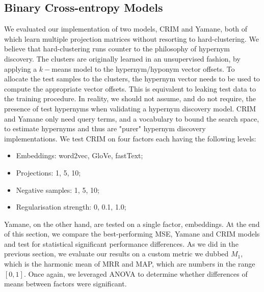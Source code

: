 \subsection{Binary Cross-entropy Models}
We evaluated our implementation of two models, CRIM and Yamane, both of which learn multiple projection matrices without resorting to hard-clustering.  We believe that hard-clustering runs counter to the philosophy of hypernym discovery.  The clusters are originally learned in an unsupervised fashion, by applying a $k-$means model to the hypernym/hyponym vector offsets.  To allocate the test samples to the clusters, the hypernym vector needs to be used to compute the appropriate vector offsets.  This is equivalent to leaking test data to the training procedure.  In reality, we should not assume, and do not require, the presence of test hypernyms when validating a hypernym discovery model.  CRIM and Yamane only need query terms, and a vocabulary to bound the search space, to estimate hypernyms and thus are "purer" hypernym discovery implementations.  We test CRIM on four factors each having the following levels:
\begin{itemize}
    \item Embeddings: word2vec, GloVe, fastText;
    \item Projections: 1, 5, 10;
    \item Negative samples: 1, 5, 10;
    \item Regularisation strength: 0, 0.1, 1.0;
\end{itemize}
Yamane, on the other hand, are tested on a single factor, embeddings.  At the end of this section, we compare the best-performing MSE, Yamane and CRIM models and test for statistical significant performance differences.  As we did in the previous section, we evaluate our results on a custom metric we dubbed $M_1$, which is the harmonic mean of \ac{MRR} and \ac{MAP}, which are numbers in the range $[0,1]$.  Once again, we leveraged \ac{ANOVA} to determine whether differences of means between factors were significant.

